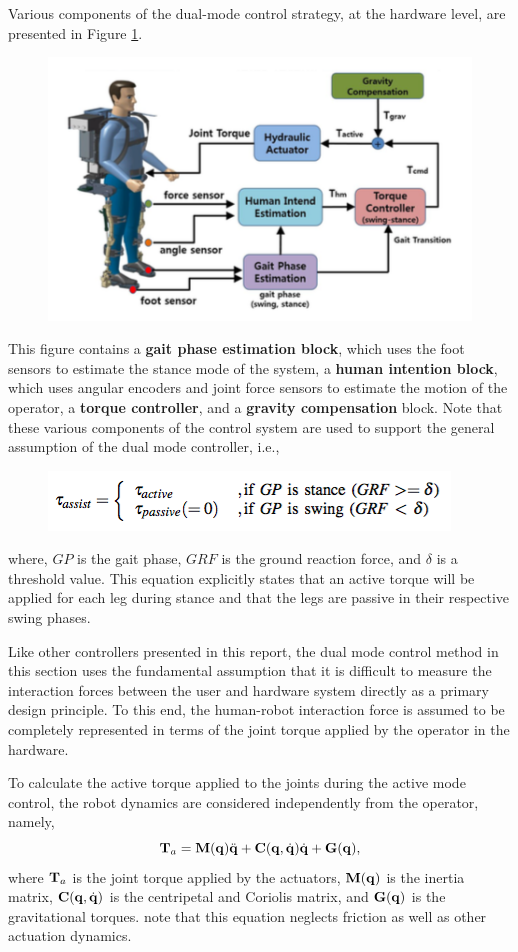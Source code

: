 Various components of the dual-mode control strategy, at the hardware level, are presented in Figure \ref{fig:suitDia}.  
  \begin{figure}[thpb]
\centering
\includegraphics[width=3.in]{exos/figs/hydLowerExrem/suitDia}
  \caption{}
  \vspace{-0.2in}
 \label{fig:suitDia}   
 \end{figure}
This figure contains a {\bf gait phase estimation block}, which uses the foot sensors to estimate the stance mode of the system, a {\bf human intention block}, which uses angular encoders and joint force sensors to estimate the motion of the operator, a {\bf torque controller}, and a {\bf gravity compensation} block.  Note that these various components of the control system are used to support the general assumption of the dual mode controller, i.e., 
 \begin{figure}[thpb]
\centering
\includegraphics[width=3.in]{exos/figs/hydLowerExrem/torAssist}
  \caption{}
  \vspace{-0.2in}
 \end{figure}
 \noindent
where, $GP$ is the gait phase, $GRF$ is the ground reaction force, and $\delta$ is a threshold value.  This equation explicitly states that an active torque will be applied for each leg during stance and that the legs are passive in their respective swing phases.

Like other controllers presented in this report, the dual mode control method in this section uses the fundamental assumption that it is difficult to measure the interaction forces between the user and hardware system directly as a primary design principle.  To this end, the human-robot interaction force is assumed to be completely represented in terms of the joint torque applied by the operator in the hardware. 

To calculate the active torque applied to the joints during the active mode control, the robot dynamics are considered independently from the operator, namely,
\begin{equation}
{\bf T}_a = {\bf M}({\bf q})\ddot{{\bf q}} + {\bf C}({\bf q},\dot{{\bf q}})\dot{{\bf q}}+{\bf G}({\bf q}),
\label{dynamics}
\end{equation}   
where ${\bf T}_a$ is the joint torque applied by the actuators, ${\bf M}({\bf q})$ is the inertia matrix, ${\bf C}({\bf q},\dot{{\bf q}})$ is the centripetal and Coriolis matrix, and ${\bf G}({\bf q})$ is the gravitational torques. note that this equation neglects friction as well as other actuation dynamics.

